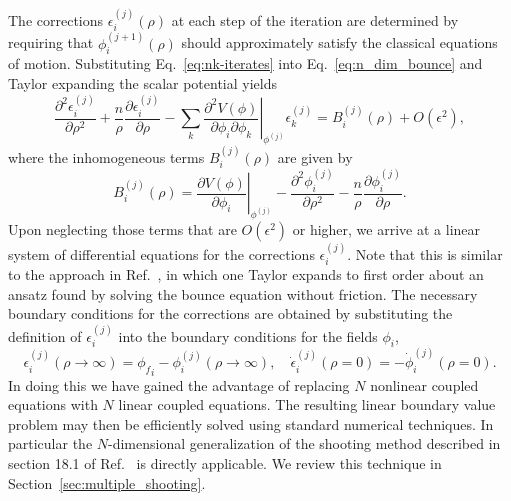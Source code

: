 \documentclass[final,3p,11pt,pdflatex]{elsarticle}
\newcommand{\secref}[1]{Section~\ref{#1}}
\renewcommand{\refeq}[1]{Eq.~\ref{#1}}
\newcommand{\refcite}[1]{Ref.~\cite{#1}}
\newcommand{\fv}{\ensuremath{\phi_f}}
\begin{document}
The corrections $\epsilon_i^{(j)}(\rho)$ at each step of the iteration are
determined by requiring that $\phi_i^{(j+1)}(\rho)$ should approximately satisfy
the classical equations of motion.  Substituting \refeq{eq:nk-iterates} into
\refeq{eq:n_dim_bounce} and Taylor expanding the scalar potential yields
\begin{equation} \label{eq:epsilon_eom}
  \frac{\partial^2 \epsilon_i^{(j)}}{\partial \rho^2}
  + \frac{n}{\rho} \frac{\partial \epsilon_i^{(j)}}{\partial \rho}
  - \sum_{k} \left . \frac{\partial^2 V(\phi)}{\partial \phi_i \partial \phi_k}
  \right |_{\phi^{(j)}} \epsilon_k^{(j)} = B_i^{(j)}(\rho) + O(\epsilon^2) ,
\end{equation}
where the inhomogeneous terms $B_i^{(j)}(\rho)$ are given by
\begin{equation} \label{eq:epsilon_inh}
  B_i^{(j)}(\rho) = \left . \frac{\partial V(\phi)}{\partial \phi_i}
  \right |_{\phi^{(j)}} - \frac{\partial^2 \phi_i^{(j)}}{\partial \rho^2}
  - \frac{n}{\rho} \frac{\partial \phi_i^{(j)}}{\partial \rho} .
\end{equation}
Upon neglecting those terms that are $O(\epsilon^2)$ or higher, we arrive
at a linear system of differential equations for the corrections
$\epsilon_i^{(j)}$.  Note that this is similar to the approach in
\refcite{Konstandin:2006nd}, in which one Taylor expands to first order
about an ansatz found by solving the bounce equation without friction.  The
necessary boundary conditions for the corrections are obtained by substituting
the definition of $\epsilon_i^{(j)}$ into the boundary conditions for the fields
$\phi_i$,
\begin{equation} \label{eq:perturbation_bcs}
  \epsilon_i^{(j)}(\rho \to \infty) = {\fv}_i - \phi_i^{(j)}(\rho \to \infty) ,
  \quad
  \dot{\epsilon}_i^{(j)}(\rho = 0) = -\dot{\phi}_i^{(j)}(\rho = 0) .
\end{equation}
In doing this we have gained the advantage of replacing $N$ nonlinear coupled
equations with $N$ linear coupled equations.  The resulting linear boundary
value problem may then be efficiently solved using standard numerical
techniques.  In particular the $N$-dimensional generalization of the shooting
method described in section 18.1 of
\refcite{VetterlingNumericalRecipesExample2017} is directly applicable.  We
review this technique in \secref{sec:multiple_shooting}.
\end{document}
